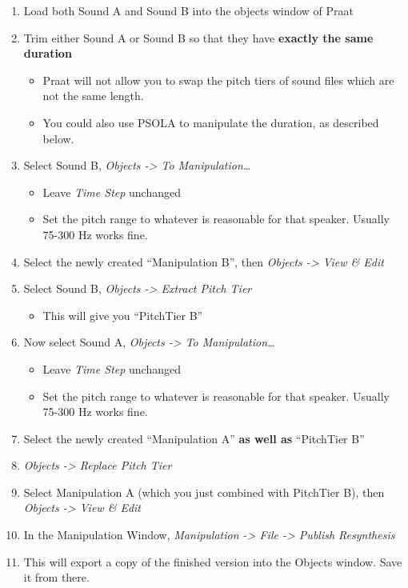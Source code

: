 \documentclass[11pt]{article}
\def\tightlist{}
\begin{document}
\begin{enumerate}
\def\labelenumi{\arabic{enumi}.}
\tightlist
\item
  Load both Sound A and Sound B into the objects window of Praat
\item
  Trim either Sound A or Sound B so that they have \textbf{exactly the
  same duration}

  \begin{itemize}
  \tightlist
  \item
    Praat will not allow you to swap the pitch tiers of sound files
    which are not the same length.
  \item
    You could also use PSOLA to manipulate the duration, as described
    below.
  \end{itemize}
\item
  Select Sound B, \emph{Objects -\textgreater{} To Manipulation\ldots{}}

  \begin{itemize}
  \tightlist
  \item
    Leave \emph{Time Step} unchanged
  \item
    Set the pitch range to whatever is reasonable for that speaker.
    Usually 75-300 Hz works fine.
  \end{itemize}
\item
  Select the newly created ``Manipulation B'', then \emph{Objects
  -\textgreater{} View \& Edit}
\item
  Select Sound B, \emph{Objects -\textgreater{} Extract Pitch Tier}

  \begin{itemize}
  \tightlist
  \item
    This will give you ``PitchTier B''
  \end{itemize}
\item
  Now select Sound A, \emph{Objects -\textgreater{} To
  Manipulation\ldots{}}

  \begin{itemize}
  \tightlist
  \item
    Leave \emph{Time Step} unchanged
  \item
    Set the pitch range to whatever is reasonable for that speaker.
    Usually 75-300 Hz works fine.
  \end{itemize}
\item
  Select the newly created ``Manipulation A'' \textbf{as well as}
  ``PitchTier B''
\item
  \emph{Objects -\textgreater{} Replace Pitch Tier}
\item
  Select Manipulation A (which you just combined with PitchTier B), then
  \emph{Objects -\textgreater{} View \& Edit}
\item
  In the Manipulation Window, \emph{Manipulation -\textgreater{} File
  -\textgreater{} Publish Resynthesis}
\item
  This will export a copy of the finished version into the Objects
  window. Save it from there.
\end{enumerate}
\end{document}
